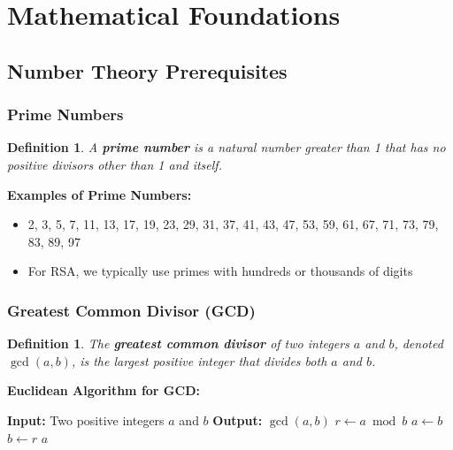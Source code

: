 \documentclass[11pt,a4paper]{article}
\newtheorem{definition}[theorem]{Definition}
\begin{document}
\section{Mathematical Foundations}

\subsection{Number Theory Prerequisites}

\subsubsection{Prime Numbers}

\begin{definition}
A \textbf{prime number} is a natural number greater than 1 that has no positive divisors other than 1 and itself.
\end{definition}

\begin{examplebox}
\textbf{Examples of Prime Numbers:}
\begin{itemize}
    \item 2, 3, 5, 7, 11, 13, 17, 19, 23, 29, 31, 37, 41, 43, 47, 53, 59, 61, 67, 71, 73, 79, 83, 89, 97
    \item For RSA, we typically use primes with hundreds or thousands of digits
\end{itemize}
\end{examplebox}

\subsubsection{Greatest Common Divisor (GCD)}

\begin{definition}
The \textbf{greatest common divisor} of two integers $a$ and $b$, denoted $\gcd(a,b)$, is the largest positive integer that divides both $a$ and $b$.
\end{definition}

\begin{mathbox}
\textbf{Euclidean Algorithm for GCD:}
\begin{algorithmic}
\STATE \textbf{Input:} Two positive integers $a$ and $b$
\STATE \textbf{Output:} $\gcd(a,b)$
    \STATE $r \leftarrow a \bmod b$
    \STATE $a \leftarrow b$
    \STATE $b \leftarrow r$
\ENDWHILE
\RETURN $a$
\end{algorithmic}
\end{mathbox}
\end{document}

